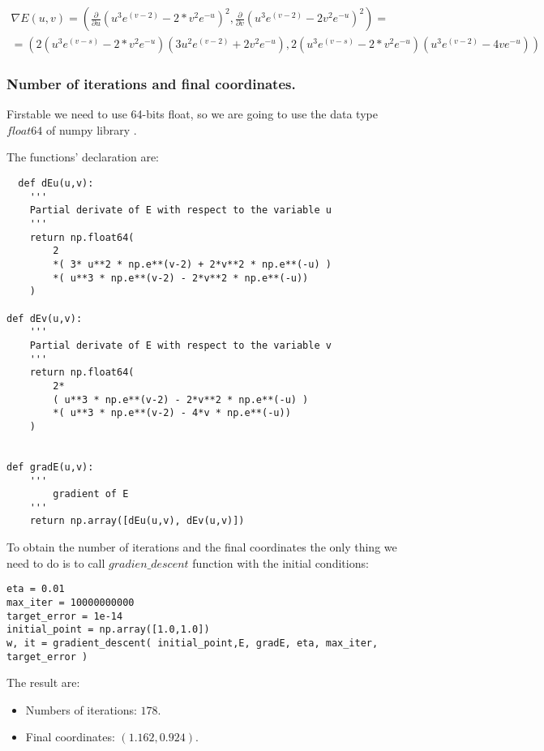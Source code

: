 \begin{multline*}
  \nabla E(u,v) = \left( \frac{\partial}{\partial u}(u^3 e^{(v-2)} - 2* v^2 e^{-u})^2 , \frac{\partial}{\partial v} (u^3 e^{(v-2)} - 2 v^2 e^{-u})^2 \right) = \\
 =  \left(2(u^3 e^{(v-s)} - 2* v^2 e^{-u})(3u^2e^{(v-2)} + 2 v^2 e^{-u} ), 2(u^3 e^{(v-s)} - 2* v^2 e^{-u})(u^3 e^{(v-2)} - 4 v e^{-u}) \right)
\end{multline*}


\subsubsection{Number of iterations and final coordinates.}

Firstable we need to use 64-bits float, so we are going to use the data type $float64$ of numpy library \cite{float64}.

The functions' declaration are:

\begin{verbatim}
  def dEu(u,v):
    '''
    Partial derivate of E with respect to the variable u
    '''
    return np.float64(
        2
        *( 3* u**2 * np.e**(v-2) + 2*v**2 * np.e**(-u) )
        *( u**3 * np.e**(v-2) - 2*v**2 * np.e**(-u))
    )
    
def dEv(u,v):
    '''
    Partial derivate of E with respect to the variable v
    '''
    return np.float64(
        2*
        ( u**3 * np.e**(v-2) - 2*v**2 * np.e**(-u) )
        *( u**3 * np.e**(v-2) - 4*v * np.e**(-u))
    )


def gradE(u,v):
    ''' 
        gradient of E
    '''
    return np.array([dEu(u,v), dEv(u,v)])

\end{verbatim}

To obtain the number of iterations and the final coordinates the only thing we need to do is to call $gradien\_descent$ function with the initial conditions:

\begin{verbatim}
eta = 0.01 
max_iter = 10000000000
target_error = 1e-14
initial_point = np.array([1.0,1.0])
w, it = gradient_descent( initial_point,E, gradE, eta, max_iter, target_error )
\end{verbatim}

The result are:

\begin{itemize}
\item Numbers of iterations: $178.$
\item Final coordinates: $( 1.162 ,  0.924 ).$
\end{itemize}

